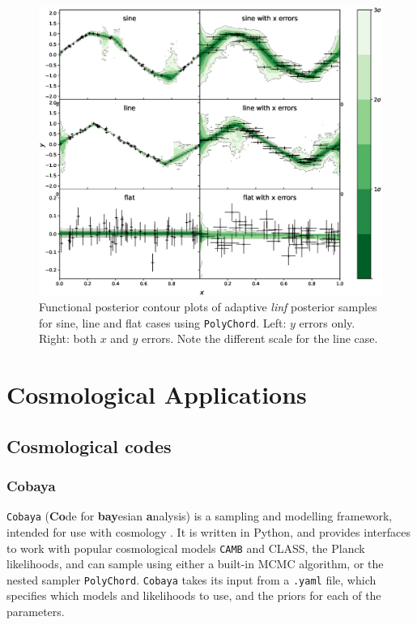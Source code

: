 \documentclass{article}
\begin{document}
\begin{figure}[H]
  \centering
  \includegraphics[width=16cm]{toysineadaptive.eps}
  \caption{Functional posterior contour plots of adaptive \textit{linf} posterior samples for sine, line and flat cases using \texttt{PolyChord}. Left: $y$ errors only. Right: both $x$ and $y$ errors. Note the different scale for the line case.}
  \label{fig:toysineadaptive}
\end{figure}

\newpage
\newpage

\section{Cosmological Applications}
\subsection{Cosmological codes}

\subsubsection{Cobaya}
\texttt{Cobaya} (\textbf{Co}de for \textbf{bay}esian \textbf{a}nalysis) is a sampling and modelling framework, intended for use with cosmology \cite{Cobaya}. It is written in Python, and provides interfaces to work with popular cosmological models \texttt{CAMB} and CLASS, the Planck likelihoods, and can sample using either a built-in MCMC algorithm, or the nested sampler \texttt{PolyChord}. \texttt{Cobaya} takes its input from a \texttt{.yaml} file, which specifies which models and likelihoods to use, and the priors for each of the parameters. 
\end{document}
